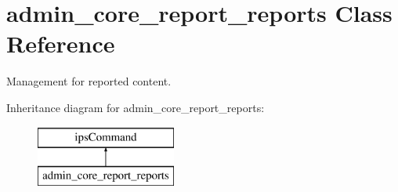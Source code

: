 \hypertarget{classadmin__core__report__reports}{\section{admin\-\_\-core\-\_\-report\-\_\-reports Class Reference}
\label{classadmin__core__report__reports}
}


Management for reported content.  


Inheritance diagram for admin\-\_\-core\-\_\-report\-\_\-reports\-:\begin{figure}[H]
\begin{center}
\leavevmode
\includegraphics[height=2.000000cm]{classadmin__core__report__reports}
\end{center}
\end{figure}
